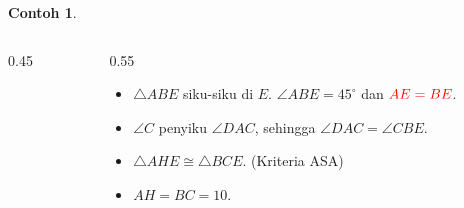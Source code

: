 ﻿\documentclass[aspectratio=169]{beamer}
\theoremstyle{definition}
\newtheorem{teorema}{Teorema}
\newtheorem{contoh}{Contoh}
\begin{document}
\begin{frame}{\insertsection}{\insertsubsection}
\begin{contoh}
\begin{columns}[T]
\begin{column}{0.45\textwidth}
      \end{column}
      \begin{column}{0.55\textwidth}
        \begin{itemize}
          \item<2-> $\triangle ABE$ siku-siku di $E$. $\angle ABE = 45^\circ$ dan $\color{red}{AE = BE}$.

          \item<3-> $\angle C$ penyiku $\angle DAC$, sehingga $\angle DAC = \angle CBE$.

          \item<4-> $\triangle AHE \cong \triangle BCE$. (Kriteria ASA)
          \item <5-> $AH = BC = \boxed{10}$.
        \end{itemize}
      \end{column}
    \end{columns}
  \end{contoh}
\end{frame}



\end{document}
